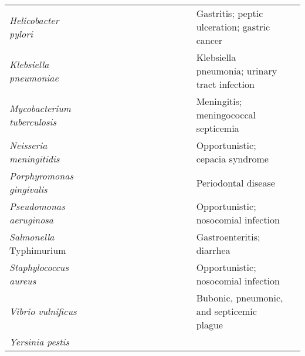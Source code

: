 \begin{sidewaystable}
\begin{tabular}{ l  c  c  c  c  c  c  c  c | c  c | c l l }
\textit{Helicobacter pylori} & 
     \cellcolor[gray]{0.8} & \cellcolor[gray]{0.8} & 
     \cellcolor[gray]{0.8} & \cellcolor[gray]{0.8} & 
     & & & & \cellcolor[gray]{0.8} & & 
     & Gastritis; peptic ulceration; gastric cancer & \cite{Thiele:2005el,Schilling:2002ck} \\ \cline{2-12}
\textit{Klebsiella pneumoniae} & 
      & & & & & & & & & \cellcolor[gray]{0.8} 
      & & Klebsiella pneumonia; urinary tract infection & \cite{Liao:2011fp} \\ \cline{2-12}
\textit{Mycobacterium tuberculosis} & 
     \cellcolor[gray]{0.8} & & \cellcolor[gray]{0.8} 
     & \cellcolor[gray]{0.8} & 
     \cellcolor[gray]{0.8} & \cellcolor[gray]{0.8} 
     & & \cellcolor[gray]{0.8} & \cellcolor[gray]{0.8} & \cellcolor[gray]{0.8} 
     & & Meningitis; meningococcal septicemia & \cite{Jamshidi:2007ei,Fang:2010gc,Beste:2007bi} \\ \cline{2-12}
\textit{Neisseria meningitidis} & 
      & \cellcolor[gray]{0.8} & & & & 
      & & & & \cellcolor[gray]{0.8} & 
      & Opportunistic; cepacia syndrome & \cite{Baart:2007cz} \\ \cline{2-12}
\textit{Porphyromonas gingivalis} & 
     \cellcolor[gray]{0.8} & \cellcolor[gray]{0.8} & & & 
     & & & & \cellcolor[gray]{0.8}  & & 
     & Periodontal disease & \cite{Mazumdar:2009gj} \\ \cline{2-12}
\textit{Pseudomonas aeruginosa} &
     \cellcolor[gray]{0.8} & & & & & & &  
     & \cellcolor[gray]{0.8} & & & Opportunistic; nosocomial infection & \cite{Oberhardt:2008fr} \\ \cline{2-12}
\textit{Salmonella} Typhimurium &
     \cellcolor[gray]{0.8} & & & \cellcolor[gray]{0.8} & 
     \cellcolor[gray]{0.8} & & &  
     & \cellcolor[gray]{0.8} & \cellcolor[gray]{0.8} 
     & & Gastroenteritis; diarrhea & \cite{AbuOun:2009co,Thiele:2011fy,Raghunathan:2009kf} \\ \cline{2-12}
\textit{Staphylococcus aureus} & 
     \cellcolor[gray]{0.8} & \cellcolor[gray]{0.8} & & \cellcolor[gray]{0.8} & 
     & & & & \cellcolor[gray]{0.8} & \cellcolor[gray]{0.8} & 
     & Opportunistic; nosocomial infection & \cite{Lee:2009fc,Heinemann:2005fc,Becker:2005hf} \\ \cline{2-12}
\textit{Vibrio vulnificus} & 
      & & & & & & \cellcolor[gray]{0.8} & & \cellcolor[gray]{0.8} & \cellcolor[gray]{0.8} 
      & \cellcolor[gray]{0.8} & Bubonic, pneumonic, and septicemic plague & \cite{Kim:2011jm} \\ \cline{2-12}
\textit{Yersinia pestis} & 

\end{tabular}
\end{sidewaystable}
